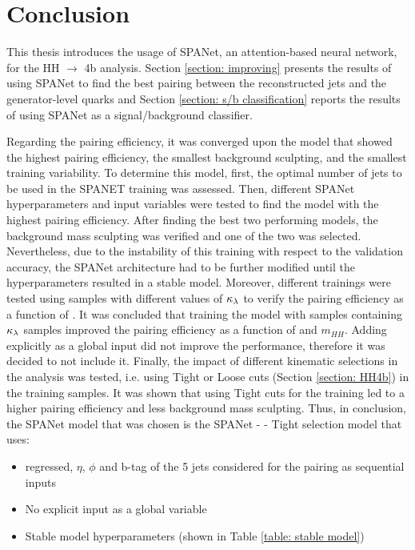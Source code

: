 \section{Conclusion} \label{section: conclusion}

This thesis introduces the usage of SPANet, an attention-based neural network, for the HH $\to$ 4b analysis. Section \ref{section: improving} presents the results of using SPANet to find the best pairing between the reconstructed jets and the generator-level quarks and Section \ref{section: s/b classification} reports the results of using SPANet as a signal/background classifier.

\vspace{0.2 cm}

Regarding the pairing efficiency, it was converged upon the model that showed the highest pairing efficiency, the smallest background sculpting, and the smallest training variability. To determine this model, first, the optimal number of jets to be used in the SPANET training was assessed. Then, different SPANet hyperparameters and input variables were tested to find the model with the highest pairing efficiency. After finding the best two performing models, the background mass sculpting was verified and one of the two was selected. Nevertheless, due to the instability of this training with respect to the validation accuracy, the SPANet architecture had to be further modified until the hyperparameters resulted in a stable model. Moreover, different trainings were tested using samples with different values of ${\kappa_\lambda}$ to verify the pairing efficiency as a function of \kl. It was concluded that training the model with samples containing ${\kappa_\lambda}$ samples improved the pairing efficiency as a function of \kl and $m_{HH}$. Adding \kl explicitly as a global input did not improve the performance, therefore it was decided to not include it. Finally, the impact of different kinematic selections in the analysis was tested, i.e. using Tight or Loose cuts (Section \ref{section: HH4b}) in the training samples. It was shown that using Tight cuts for the training led to a higher pairing efficiency and less background mass sculpting. Thus, in conclusion, the SPANet model that was chosen is the SPANet - \kl - Tight selection model that uses:
\begin{itemize}
    \item \pt regressed, $\eta$, $\phi$ and b-tag of the 5 jets considered for the pairing as sequential inputs
    \item No explicit \kl input as a global variable
    \item Stable model hyperparameters (shown in Table \ref{table: stable model})
\end{itemize}

